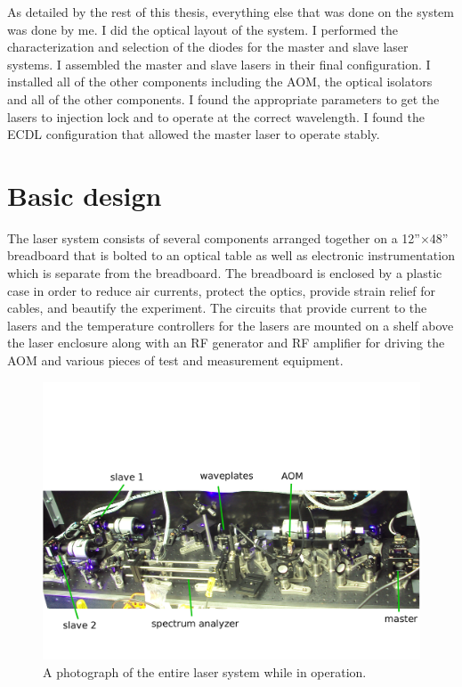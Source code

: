As detailed by the rest of this thesis, everything else that was done on the system was done by me. I did the optical layout of the system. I performed the characterization and selection of the diodes for the master and slave laser systems. I assembled the master and slave lasers in their final configuration. I installed all of the other components including the AOM, the optical isolators and all of the other components. I found the appropriate parameters to get the lasers to injection lock and to operate at the correct wavelength. I found the ECDL configuration that allowed the master laser to operate stably.

\section{Basic design}
The laser system consists of several components arranged together on a 12''$\times$48'' breadboard that is bolted to an optical table as well as electronic instrumentation which is separate from the breadboard. The breadboard is enclosed by a plastic case in order to reduce air currents, protect the optics, provide strain relief for cables, and beautify the experiment. The circuits that provide current to the lasers and the temperature controllers for the lasers are mounted on a shelf above the laser enclosure along with an RF generator and RF amplifier for driving the AOM and various pieces of test and measurement equipment.  
\begin{figure}
    \centerline{\includegraphics[width=1\textwidth]{entire_setup}}
    \caption[Photo of entire laser system]{\label{fullexperimentphoto}
A photograph of the entire laser system while in operation.
    }
\end{figure}

